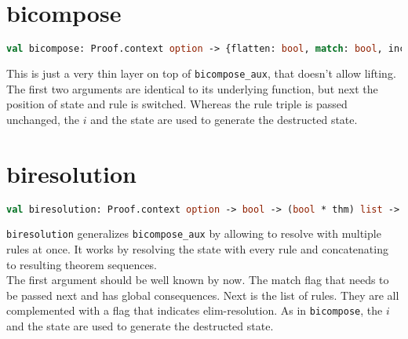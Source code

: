 \section{bicompose}

\begin{lstlisting}[language=ML,breaklines=true]
val bicompose: Proof.context option -> {flatten: bool, match: bool, incremented: bool} -> bool * thm * int -> int -> thm -> thm Seq.seq
\end{lstlisting}

This is just a very thin layer on top of \texttt{bicompose\_aux}, that doesn't allow lifting. The first two arguments are identical to its underlying function, but next the position of state and rule is switched. Whereas the rule triple is passed unchanged, the $i$ and the state are used to generate the destructed state.\\

\section{biresolution}

\begin{lstlisting}[language=ML,breaklines=true]
val biresolution: Proof.context option -> bool -> (bool * thm) list -> int -> thm -> thm Seq.seq
\end{lstlisting}

\texttt{biresolution} generalizes \texttt{bicompose\_aux} by allowing to resolve with multiple rules at once. It works by resolving the state with every rule and concatenating to resulting theorem sequences.\\
The first argument should be well known by now. The match flag that needs to be passed next and has global consequences. Next is the list of rules. They are all complemented with a flag that indicates elim-resolution. As in \texttt{bicompose}, the $i$ and the state are used to generate the destructed state.